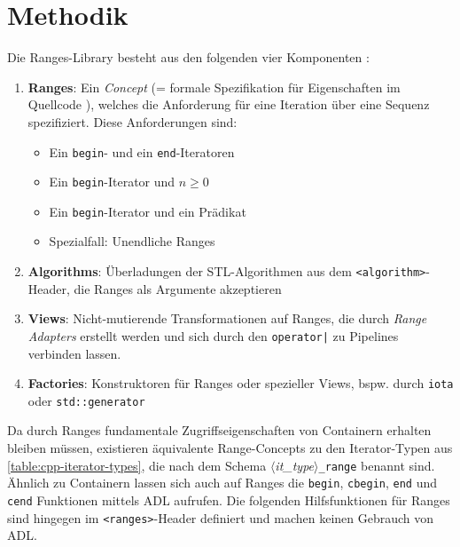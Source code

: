 \documentclass[runningheads]{llncs}
\begin{document}
\section{Methodik}

Die Ranges-Library besteht aus den folgenden vier Komponenten \cite[S.617]{profcpp}:

\begin{enumerate}[1.]
	\item \textbf{Ranges}: Ein \textit{Concept} (= formale Spezifikation für Eigenschaften im Quellcode \cite[vgl. S.454 ff.]{profcpp}), welches die Anforderung für eine Iteration über eine Sequenz spezifiziert.
	      Diese Anforderungen sind:

	      \begin{itemize}
		      \item Ein \texttt{begin}- und ein \texttt{end}-Iteratoren
		      \item Ein \texttt{begin}-Iterator und $n\geqslant0$
		      \item Ein \texttt{begin}-Iterator und ein Prädikat
		      \item Spezialfall: Unendliche Ranges
	      \end{itemize}

	\item \textbf{Algorithms}: Überladungen der STL-Algorithmen aus dem \texttt{<algorithm>}-Header, die Ranges als Argumente akzeptieren

	\item \textbf{Views}: Nicht-mutierende Transformationen auf Ranges, die durch \textit{Range Adapters} erstellt werden und sich durch den \texttt{operator|} zu Pipelines verbinden lassen.

	\item \textbf{Factories}: Konstruktoren für Ranges oder spezieller Views, bspw. durch \texttt{iota} oder \texttt{std::generator}
\end{enumerate}

Da durch Ranges fundamentale Zugriffseigenschaften von Containern erhalten bleiben müssen, existieren äquivalente Range-Concepts zu den Iterator-Typen aus \autoref{table:cpp-iterator-types}, die nach dem Schema $\langle$\textit{it\_type}$\rangle$\texttt{\_range} benannt sind.
Ähnlich zu Containern lassen sich auch auf Ranges die \texttt{begin}, \texttt{cbegin}, \texttt{end} und \texttt{cend} Funktionen mittels ADL aufrufen.
Die folgenden Hilfsfunktionen für Ranges sind hingegen im \texttt{<ranges>}-Header definiert und machen keinen Gebrauch von ADL.
\end{document}
